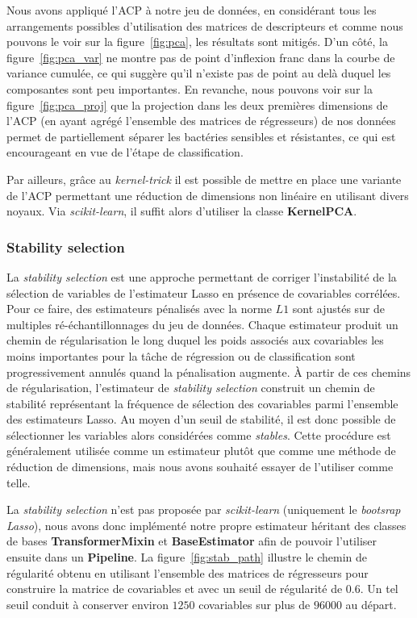 \documentclass[11pt]{article}
\begin{document}
  Nous avons appliqué l'ACP à notre jeu de données, en considérant tous les arrangements possibles d'utilisation des matrices de descripteurs et comme nous pouvons le voir sur la figure~\ref{fig:pca}, les résultats sont mitigés.
  D'un côté, la figure~\ref{fig:pca_var} ne montre pas de point d'inflexion franc dans la courbe de variance cumulée, ce qui suggère qu'il n'existe pas de point au delà duquel les composantes sont peu importantes.
  En revanche, nous pouvons voir sur la figure~\ref{fig:pca_proj} que la projection dans les deux premières dimensions de l'ACP (en ayant agrégé l'ensemble des matrices de régresseurs) de nos données permet de partiellement séparer les bactéries sensibles et résistantes, ce qui est encourageant en vue de l'étape de classification.

  Par ailleurs, grâce au \textit{kernel-trick} il est possible de mettre en place une variante de l'ACP permettant une réduction de dimensions non linéaire en utilisant divers noyaux.
  Via \textit{scikit-learn}, il suffit alors d'utiliser la classe \textbf{KernelPCA}.

\hypertarget{stability-selection}{%
\subsubsection{Stability selection}\label{stability-selection}}

  La \textit{stability selection} est une approche permettant de corriger l'instabilité de la sélection de variables de l'estimateur Lasso en présence de covariables corrélées.
  Pour ce faire, des estimateurs pénalisés avec la norme $L1$ sont ajustés sur de multiples ré-échantillonnages du jeu de données.
  Chaque estimateur produit un chemin de régularisation le long duquel les poids associés aux covariables les moins importantes pour la tâche de régression ou de classification sont progressivement annulés quand la pénalisation augmente.
  À partir de ces chemins de régularisation, l'estimateur de \textit{stability selection} construit un chemin de stabilité représentant la fréquence de sélection des covariables parmi l'ensemble des estimateurs Lasso.
  Au moyen d'un seuil de stabilité, il est donc possible de sélectionner les variables alors considérées comme \textit{stables}.
  Cette procédure est généralement utilisée comme un estimateur plutôt que comme une méthode de réduction de dimensions, mais nous avons souhaité essayer de l'utiliser comme telle.

  La \textit{stability selection} n'est pas proposée par \textit{scikit-learn} (uniquement le \textit{bootsrap Lasso}), nous avons donc implémenté notre propre estimateur héritant des classes de bases \textbf{TransformerMixin} et \textbf{BaseEstimator} afin de pouvoir l'utiliser ensuite dans un \textbf{Pipeline}.
  La figure~\ref{fig:stab_path} illustre le chemin de régularité obtenu en utilisant l'ensemble des matrices de régresseurs pour construire la matrice de covariables et avec un seuil de régularité de $0.6$.
  Un tel seuil conduit à conserver environ $1250$ covariables sur plus de $96000$ au départ.
\end{document}
